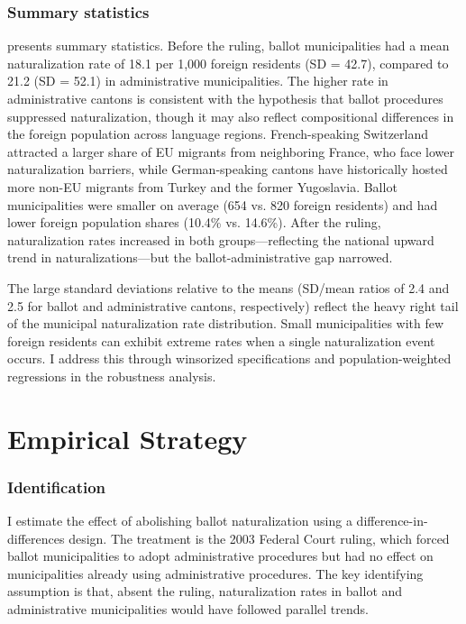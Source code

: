 \documentclass[12pt]{article}
\begin{document}
\subsubsection*{Summary statistics}  presents summary statistics. Before the ruling, ballot municipalities had a mean naturalization rate of 18.1 per 1,000 foreign residents (SD = 42.7), compared to 21.2 (SD = 52.1) in administrative municipalities. The higher rate in administrative cantons is consistent with the hypothesis that ballot procedures suppressed naturalization, though it may also reflect compositional differences in the foreign population across language regions. French-speaking Switzerland attracted a larger share of EU migrants from neighboring France, who face lower naturalization barriers, while German-speaking cantons have historically hosted more non-EU migrants from Turkey and the former Yugoslavia. Ballot municipalities were smaller on average (654 vs. 820 foreign residents) and had lower foreign population shares (10.4\% vs. 14.6\%). After the ruling, naturalization rates increased in both groups---reflecting the national upward trend in naturalizations---but the ballot-administrative gap narrowed.

The large standard deviations relative to the means (SD/mean ratios of 2.4 and 2.5 for ballot and administrative cantons, respectively) reflect the heavy right tail of the municipal naturalization rate distribution. Small municipalities with few foreign residents can exhibit extreme rates when a single naturalization event occurs. I address this through winsorized specifications and population-weighted regressions in the robustness analysis.




\section{Empirical Strategy}\label{sec:method}

\subsubsection*{Identification} I estimate the effect of abolishing ballot naturalization using a difference-in-differences design. The treatment is the 2003 Federal Court ruling, which forced ballot municipalities to adopt administrative procedures but had no effect on municipalities already using administrative procedures. The key identifying assumption is that, absent the ruling, naturalization rates in ballot and administrative municipalities would have followed parallel trends.
\end{document}
